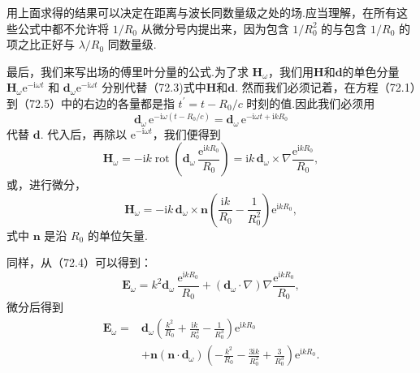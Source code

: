用上面求得的结果可以决定在距离与波长同数量级之处的场.应当理解，在所有这些公式中都不允许将 $1/R_0$ 从微分号内提出来，因为包含 $1/R_0^2$ 的与包含 $1/R_0$ 的项之比正好与 $\lambda/R_0$ 同数量级.

最后，我们来写出场的傅里叶分量的公式.为了求 $\boldsymbol{H}_\omega$，我们用$\boldsymbol{H}$和$\boldsymbol{d}$的单色分量 $\boldsymbol{H}_\omega\mathrm{e}^{-\mathrm{i}\omega t}$ 和 $\boldsymbol{d}_\omega\mathrm{e}^{-\mathrm{i}\omega t}$ 分别代替（72.3)式中$\boldsymbol{H}$和$\boldsymbol{d}$. 然而我们必须记着，在方程（72.1）到（72.5）中的右边的各量都是指 $t^{\prime}=t-R_0/c$ 时刻的值.因此我们必须用
\begin{equation*}
  \boldsymbol{d}_\omega\,\mathrm{e}^{-\mathrm{i}\omega(t-R_0/c)}=\boldsymbol{d}_\omega\,\mathrm{e}^{-\mathrm{i}\omega t+\mathrm{i}kR_0}
\end{equation*}
代替 $\boldsymbol{d}$. 代入后，再除以 $\mathrm{e}^{-\mathrm{i}\omega t}$，我们便得到
\begin{equation*}
  \boldsymbol{H}_\omega=-\mathrm{i}k\operatorname{rot}\left(\boldsymbol{d}_\omega\,\frac{\mathrm{e}^{\mathrm{i}kR_0}}{R_0}\right)
  =\mathrm{i}k\,\boldsymbol{d}_\omega\times\nabla\frac{\mathrm{e}^{\mathrm{i}kR_0}}{R_0},
\end{equation*}
或，进行微分，
\begin{equation}
  \boldsymbol{H}_\omega=-\mathrm{i}k\,\boldsymbol{d}_\omega\times\boldsymbol{n}
  \left(\frac{\mathrm{i}k}{R_0}-\frac{1}{R_0^2}\right)\mathrm{e}^{\mathrm{i}kR_0},
\end{equation}
式中 $\boldsymbol{n}$ 是沿 $R_0$ 的单位矢量.

同样，从（72.4）可以得到：
\begin{equation*}
  \boldsymbol{E}_\omega=k^2\boldsymbol{d}_\omega\,\frac{\mathrm{e}^{\mathrm{i}kR_0}}{R_0}
  +(\boldsymbol{d}_\omega\cdot\nabla)\nabla\frac{\mathrm{e}^{\mathrm{i}kR_0}}{R_0},
\end{equation*}
微分后得到
\begin{equation}
\begin{aligned}
  \boldsymbol{E}_\omega={}&\boldsymbol{d}_\omega\left(\frac{k^2}{R_0}+\frac{\mathrm{i}k}{R_0^2}-\frac{1}{R_0^3}\right)\mathrm{e}^{\mathrm{i}kR_0}\\
  &+\boldsymbol{n}(\boldsymbol{n}\cdot\boldsymbol{d}_\omega)\left(-\frac{k^2}{R_0}-\frac{3\mathrm{i}k}{R_0^2}+\frac{3}{R_0^3}\right)\mathrm{e}^{\mathrm{i}kR_0}.
\end{aligned}
\end{equation}

